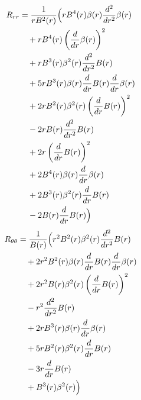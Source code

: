 \documentclass[11pt,a4paper]{article}
\begin{document}
\begin{align*}
  R_{rr} &= \frac{1}{r B^{2}{\left(r \right)}}\Bigl(r B^{4}{\left(r \right)} \beta{\left(r \right)} \frac{d^{2}}{d r^{2}} \beta{\left(r \right)} \\
  &\quad + r B^{4}{\left(r \right)} \left(\frac{d}{d r} \beta{\left(r \right)}\right)^{2} \\
  &\quad + r B^{3}{\left(r \right)} \beta^{2}{\left(r \right)} \frac{d^{2}}{d r^{2}} B{\left(r \right)} \\
  &\quad + 5 r B^{3}{\left(r \right)} \beta{\left(r \right)} \frac{d}{d r} B{\left(r \right)} \frac{d}{d r} \beta{\left(r \right)} \\
  &\quad + 2 r B^{2}{\left(r \right)} \beta^{2}{\left(r \right)} \left(\frac{d}{d r} B{\left(r \right)}\right)^{2} \\
  &\quad - 2 r B{\left(r \right)} \frac{d^{2}}{d r^{2}} B{\left(r \right)} \\
  &\quad + 2 r \left(\frac{d}{d r} B{\left(r \right)}\right)^{2} \\
  &\quad + 2 B^{4}{\left(r \right)} \beta{\left(r \right)} \frac{d}{d r} \beta{\left(r \right)} \\
  &\quad + 2 B^{3}{\left(r \right)} \beta^{2}{\left(r \right)} \frac{d}{d r} B{\left(r \right)} \\
  &\quad - 2 B{\left(r \right)} \frac{d}{d r} B{\left(r \right)}\Bigr)
\end{align*}
\begin{align*}
  R_{\theta\theta} &= \frac{1}{B{\left(r \right)}}\Bigl(r^{2} B^{2}{\left(r \right)} \beta^{2}{\left(r \right)} \frac{d^{2}}{d r^{2}} B{\left(r \right)} \\
  &\quad + 2 r^{2} B^{2}{\left(r \right)} \beta{\left(r \right)} \frac{d}{d r} B{\left(r \right)} \frac{d}{d r} \beta{\left(r \right)} \\
  &\quad + 2 r^{2} B{\left(r \right)} \beta^{2}{\left(r \right)} \left(\frac{d}{d r} B{\left(r \right)}\right)^{2} \\
  &\quad - r^{2} \frac{d^{2}}{d r^{2}} B{\left(r \right)} \\
  &\quad + 2 r B^{3}{\left(r \right)} \beta{\left(r \right)} \frac{d}{d r} \beta{\left(r \right)} \\
  &\quad + 5 r B^{2}{\left(r \right)} \beta^{2}{\left(r \right)} \frac{d}{d r} B{\left(r \right)} \\
  &\quad - 3 r \frac{d}{d r} B{\left(r \right)} \\
  &\quad + B^{3}{\left(r \right)} \beta^{2}{\left(r \right)}\Bigr)
\end{align*}
\end{document}

